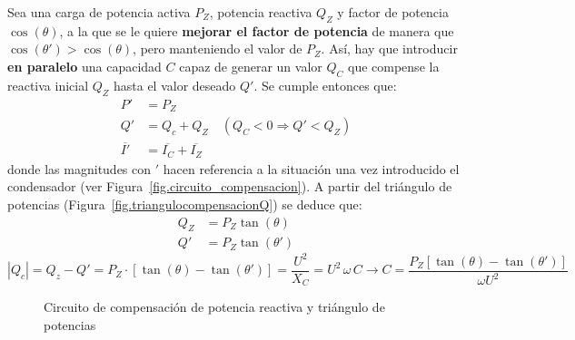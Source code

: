 \documentclass[11pt]{book} %
\numberwithin{dummy}{section}
\theoremstyle{ocrenumbox}
\theoremstyle{blacknumex}
\theoremstyle{blacknumbox}
\theoremstyle{ocrenum}
\begin{document}
	Sea una carga de potencia activa $P_Z$, potencia reactiva $Q_Z$ y factor de potencia $\cos(\theta)$, a la que se le quiere \textbf{mejorar el factor de potencia} de manera que $\cos (\theta') > \cos (\theta)$, pero manteniendo el valor de $P_Z$. Así, hay que introducir \textbf{en paralelo} una capacidad $C$ capaz de generar un valor $Q_C$ que compense la reactiva inicial $Q_Z$ hasta el valor deseado $Q'$. Se cumple entonces que: 
	\begin{align*}
		P' &= P_Z\\
		Q' &= Q_c + Q_Z \quad (Q_C<0\Rightarrow Q' < Q_Z)\\
		\overline{I'} &= \overline{I_C} + \overline{I_Z}
	\end{align*}
	donde las magnitudes con $'$ hacen referencia a la situación una vez introducido el condensador (ver Figura~\ref{fig.circuito_compensacion}). A partir del triángulo de potencias (Figura~\ref{fig.triangulocompensacionQ}) se deduce que:
	\begin{align*}
		Q_Z &= P_Z \tan (\theta)\\
		Q'&= P_Z \tan (\theta')
	\end{align*}
	\begin{equation}
		|Q_c| = Q_z - Q' = P_Z\cdot \left[\tan (\theta) - \tan (\theta')\right]=\dfrac{U^2}{X_C}={U^2\,\omega\,C}\rightarrow \boxed{C=\frac{P_Z \left[\tan (\theta) - \tan (\theta')\right]}{\omega U^2}}
	\end{equation}
	
	
	\begin{figure}
		\centering
		\hfil
		\caption{Circuito de compensación de potencia reactiva y triángulo de potencias}
		\label{fig.circuitocompensacionreactiva}
	\end{figure}
	
\end{document}

